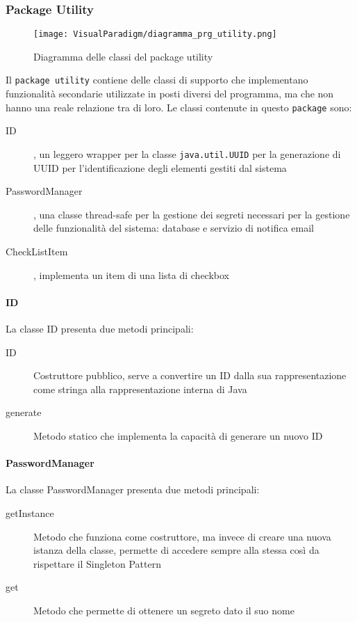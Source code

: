 
\subsubsection{Package Utility}
\label{sec:prg_utility}
\begin{figure}[!ht]
  \centering
  \texttt{[image: VisualParadigm/diagramma\_prg\_utility.png]}
  \caption{Diagramma delle classi del package utility}
  \label{fig:prg_utility}
\end{figure}

Il \texttt{package utility} contiene delle classi di supporto che
implementano funzionalità secondarie utilizzate in posti diversi del
programma, ma che non hanno una reale relazione tra di loro.
Le classi contenute in questo \texttt{package} sono:
\begin{description}
\item[ID], un leggero wrapper per la classe \texttt{java.util.UUID}
  per la generazione di UUID per l'identificazione degli elementi
  gestiti dal sistema
\item[PasswordManager], una classe thread-safe per la gestione dei
  segreti necessari per la gestione delle funzionalità del sistema:
  database e servizio di notifica email
\item[CheckListItem], implementa un item di una lista di checkbox
\end{description}

\paragraph{ID}
La classe ID presenta due metodi principali:
\begin{description}
\item[ID] Costruttore pubblico, serve a convertire un ID dalla sua rappresentazione come stringa alla rappresentazione interna di Java
\item[generate] Metodo statico che implementa la capacità di generare
  un nuovo ID
\end{description}

\paragraph{PasswordManager}
La classe PasswordManager presenta due metodi principali:
\begin{description}
\item[getInstance] Metodo che funziona come costruttore, ma invece di
  creare una nuova istanza della classe, permette di accedere sempre
  alla stessa così da rispettare il Singleton Pattern
\item[get] Metodo che permette di ottenere un segreto dato il suo nome
\end{description}

